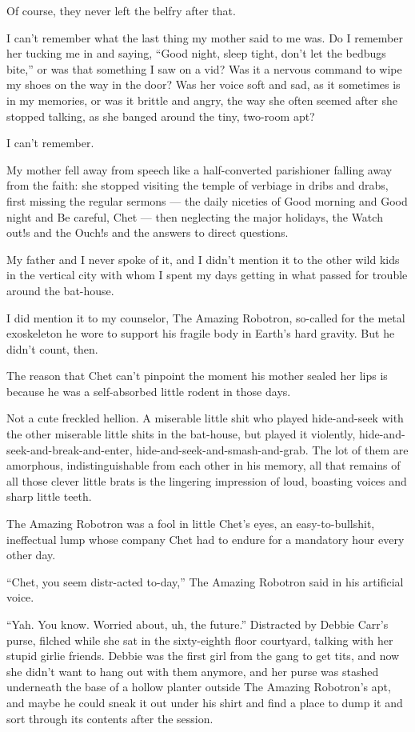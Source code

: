 Of course, they never left the belfry after that.

\tb

I can't remember what the last thing my mother said to me was. Do I
remember her tucking me in and saying,
``Good night, sleep tight, don't let the bedbugs bite,'' or was
that something I saw on a vid? Was it a nervous command to wipe my
shoes on the way in the door? Was her voice soft and sad, as it
sometimes is in my memories, or was it brittle and angry, the way
she often seemed after she stopped talking, as she banged around
the tiny, two-room apt?

I can't remember.

My mother fell away from speech like a half-converted parishioner
falling away from the faith: she stopped visiting the temple of
verbiage in dribs and drabs, first missing the regular sermons ---
the daily niceties of Good morning and Good night and Be careful,
Chet --- then neglecting the major holidays, the Watch out!s and
the Ouch!s and the answers to direct questions.

My father and I never spoke of it, and I didn't mention it to the
other wild kids in the vertical city with whom I spent my days
getting in what passed for trouble around the bat-house.

I did mention it to my counselor, The Amazing Robotron, so-called
for the metal exoskeleton he wore to support his fragile body in
Earth's hard gravity. But he didn't count, then.

\tb

The reason that Chet can't pinpoint the moment his mother sealed
her lips is because he was a self-absorbed little rodent in those
days.

Not a cute freckled hellion. A miserable little shit who played
hide-and-seek with the other miserable little shits in the
bat-house, but played it violently,
hide-and-seek-and-break-and-enter,
hide-and-seek-and-smash-and-grab. The lot of them are amorphous,
indistinguishable from each other in his memory, all that remains
of all those clever little brats is the lingering impression of
loud, boasting voices and sharp little teeth.

The Amazing Robotron was a fool in little Chet's eyes, an
easy-to-bullshit, ineffectual lump whose company Chet had to endure
for a mandatory hour every other day.

``Chet, you seem distr-acted to-day,'' The Amazing Robotron said in
his artificial voice.

``Yah. You know. Worried about, uh, the future.'' Distracted by
Debbie Carr's purse, filched while she sat in the sixty-eighth
floor courtyard, talking with her stupid girlie friends. Debbie was
the first girl from the gang to get tits, and now she didn't want
to hang out with them anymore, and her purse was stashed underneath
the base of a hollow planter outside The Amazing Robotron's apt,
and maybe he could sneak it out under his shirt and find a place to
dump it and sort through its contents after the session.

